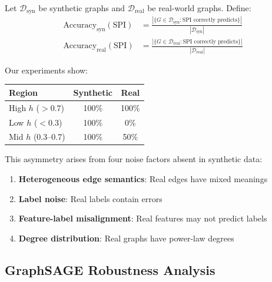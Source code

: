 \begin{theorem}
\label{thm:synthetic_real_gap}
Let $\mathcal{D}_{\text{syn}}$ be synthetic graphs and $\mathcal{D}_{\text{real}}$ be real-world graphs. Define:
\begin{align}
\text{Accuracy}_{\text{syn}}(\text{SPI}) &= \frac{|\{G \in \mathcal{D}_{\text{syn}} : \text{SPI correctly predicts}\}|}{|\mathcal{D}_{\text{syn}}|} \\
\text{Accuracy}_{\text{real}}(\text{SPI}) &= \frac{|\{G \in \mathcal{D}_{\text{real}} : \text{SPI correctly predicts}\}|}{|\mathcal{D}_{\text{real}}|}
\end{align}

Our experiments show:
\begin{center}
\begin{tabular}{lcc}
\toprule
\textbf{Region} & \textbf{Synthetic} & \textbf{Real} \\
\midrule
High $h$ ($> 0.7$) & 100\% & 100\% \\
Low $h$ ($< 0.3$) & 100\% & 0\% \\
Mid $h$ (0.3--0.7) & 100\% & 50\% \\
\bottomrule
\end{tabular}
\end{center}

This asymmetry arises from four noise factors absent in synthetic data:
\begin{enumerate}
\item \textbf{Heterogeneous edge semantics}: Real edges have mixed meanings
\item \textbf{Label noise}: Real labels contain errors
\item \textbf{Feature-label misalignment}: Real features may not predict labels
\item \textbf{Degree distribution}: Real graphs have power-law degrees
\end{enumerate}
\end{theorem}

\subsection{GraphSAGE Robustness Analysis}

